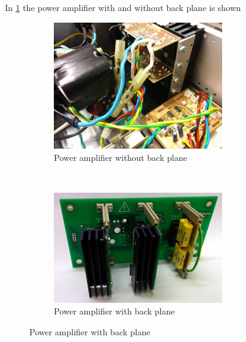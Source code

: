 In \cref{fig:TK530_before} the power amplifier with and without back plane is shown


\begin{figure}
    \centering
    \begin{subfigure}{0.45\textwidth}
        \includegraphics[width=0.8\textwidth]{img/IMG_20161212_162711.jpg}
        \caption{Power amplifier without back plane}
        \label{fig:TK530_before}
    \end{subfigure}
    ~
    \begin{subfigure}{0.45\textwidth}
        \includegraphics[width=0.8\textwidth]{img/TK530_Kraftbakplan.jpg}
        \caption{Power amplifier with back plane}
        \label{fig:TK530_after}
    \end{subfigure}
\end{figure}